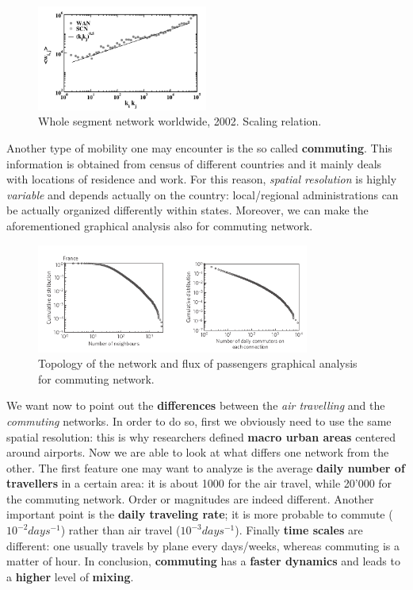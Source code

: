 \documentclass[../main/main.tex]{subfiles}
\begin{document}
\begin{figure}[h!]
\centering
\includegraphics[width=0.5\textwidth]{../lessons/image/14/image02.png}
\caption{\label{fig:13_02} Whole segment network worldwide, 2002. Scaling relation.}
\end{figure}

Another type of mobility one may encounter is the so called \textbf{commuting}. This information is obtained from census of different countries and it mainly deals with locations of residence and work. For this reason, \textit{spatial resolution} is highly \textit{variable} and depends actually on the country: local/regional administrations can be actually organized differently within states. Moreover, we can make the aforementioned graphical analysis also for commuting network.

\begin{figure}[h!]
\centering
\includegraphics[width=0.8\textwidth]{../lessons/image/14/image03.png}
\caption{\label{fig:13_03}  Topology of the network and flux of passengers graphical analysis for commuting network.}
\end{figure}

We want now to point out the \textbf{differences} between the \textit{air travelling} and the \textit{commuting} networks. In order to do so, first we obviously need to use the same spatial resolution: this is why researchers defined \textbf{macro urban areas} centered around airports. Now we are able to look at what differs one network from the other. The first feature one may want to analyze is the average \textbf{daily number of travellers} in a certain area: it is about 1000 for the air travel, while 20'000 for the commuting network. Order or magnitudes are indeed different. Another important point is the \textbf{daily traveling rate}; it is more probable to commute ($10^{-2} days^{-1}$) rather than air travel ($10^{-3} days^{-1}$). Finally \textbf{time scales} are different: one usually travels by plane every days/weeks, whereas commuting is a matter of hour. In conclusion, \textbf{commuting} has a \textbf{faster dynamics} and leads to a \textbf{higher} level of \textbf{mixing}.
\end{document}
